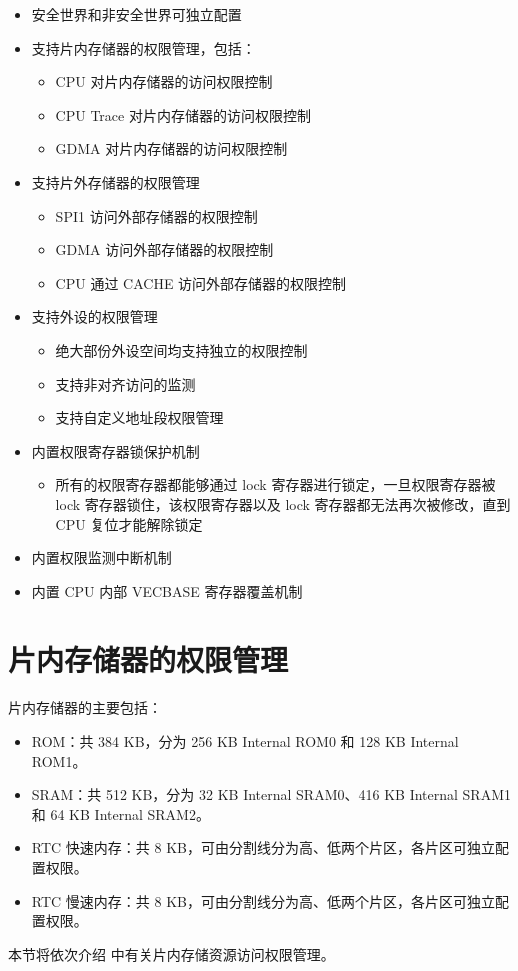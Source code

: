 \documentclass[main\_\_CN.tex]{subfiles}
\begin{document}
\begin{itemize}
    \item 安全世界和非安全世界可独立配置
    \item 支持片内存储器的权限管理，包括：
    \begin{itemize}
        \item CPU 对片内存储器的访问权限控制
        \item CPU Trace 对片内存储器的访问权限控制
        \item GDMA 对片内存储器的访问权限控制
    \end{itemize}
    \item 支持片外存储器的权限管理
    \begin{itemize}
        \item SPI1 访问外部存储器的权限控制
        \item GDMA 访问外部存储器的权限控制
        \item CPU 通过 CACHE 访问外部存储器的权限控制
    \end{itemize}
    \item 支持外设的权限管理
    \begin{itemize}
        \item 绝大部份外设空间均支持独立的权限控制
        \item 支持非对齐访问的监测
        \item 支持自定义地址段权限管理
    \end{itemize}
    \item 内置权限寄存器锁保护机制
    \begin{itemize}
        \item 所有的权限寄存器都能够通过 lock 寄存器进行锁定，一旦权限寄存器被 lock 寄存器锁住，该权限寄存器以及 lock 寄存器都无法再次被修改，直到 CPU 复位才能解除锁定
    \end{itemize}
    \item 内置权限监测中断机制
    \item 内置 CPU 内部 VECBASE 寄存器覆盖机制
\end{itemize}

\section{片内存储器的权限管理}

\chipname{} 片内存储器的主要包括：
\begin{itemize}
    \item ROM：共 384 KB，分为 256 KB Internal ROM0 和 128 KB Internal ROM1。
    \item SRAM：共 512 KB，分为 32 KB Internal SRAM0、416 KB Internal SRAM1 和 64 KB Internal SRAM2。
    \item RTC 快速内存：共 8 KB，可由分割线分为高、低两个片区，各片区可独立配置权限。
    \item RTC 慢速内存：共 8 KB，可由分割线分为高、低两个片区，各片区可独立配置权限。
\end{itemize}
本节将依次介绍 \chipname{} 中有关片内存储资源访问权限管理。
\end{document}
